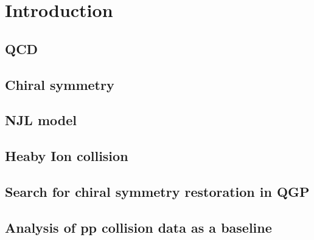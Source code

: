 \section{Introduction}
\subsection{QCD}
\subsection{Chiral symmetry}
\subsection{NJL model}
\subsection{Heaby Ion collision}
\subsection{Search for chiral symmetry restoration in QGP}
\subsection{Analysis of pp collision data as a baseline}